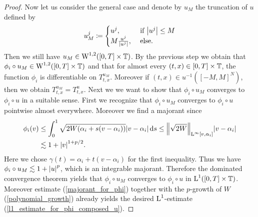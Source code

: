 \begin{proof}
	Now let us consider the general case and denote by $ u_{ M } $ the truncation of $ u $ defined by
	\begin{equation*}
		u_{ M }^{ j } 
		\coloneqq
		\begin{cases}
			u^{ j }, & \text{ if } \abs{ u^{ j } } \leq M 
			\\
			M \frac{ u^{ j } }{ \abs{ u^{ j } } },
			& \text{ else}.
		\end{cases}
	\end{equation*}
	Then we still have $ u_{ M } \in \operatorname{W}^{ 1, 2 } ( [ 0 , T ] \times 
	\operatorname{\mathbb{T}} ) $.
	 By the previous step we obtain that $ \phi_{ i } \circ u_{ M } \in \operatorname{W}^{ 
	 1, 2 } ( [ 0 , T ] \times \operatorname{\mathbb{T}} ) $ and that for almost every $ ( t, 
	 x ) \in [ 0 , T ] \times \operatorname{\mathbb{T}} $, the function $ \phi_{ i } $ is 
	 differentiable on $ T_{ t, x }^{ u_{ M } } $. Moreover if $ ( t, x ) \in 
	 u^{ - 1 } ( [ - M , M ]^{ N } ) $, then we obtain $ T_{ t, x }^{ u_{ M } } 
	 = T_{ t, x }^{ u } $.
	Next we we want to show that $ \phi_{ i } \circ u_{ M } $ converges to $ \phi_{ i } \circ u $ in a suitable sense. First we recognize that $ \phi_{ i } \circ u_{ M } $ converges to $ \phi_{ i } \circ u $ pointwise almost everywhere. Moreover we find a majorant since
	\begin{align}
		\notag
		\phi_{ i } ( v ) 
		&
		\leq
		\int_{ 0 }^{ 1 }
			\sqrt{ 2 W ( \alpha_{ i } + s ( v - \alpha_{ i } ) ) }
			\abs{ v - \alpha_{i } }
		\dd{ s }
		\leq
		\norm{ \sqrt{ 2 W } }_{ \operatorname{L}^{ \infty } [ v, \alpha_{ i } ] }
		\abs{ v - \alpha_{ i } }
		\\
		\label{majorant_for_phi}
		& \lesssim
		1 + \abs{ v }^{ 1 + p/2 }.
	\end{align}
	Here we chose $ \gamma ( t ) = \alpha_{ i } + t ( v - \alpha_{ i } ) $ for 
	the first inequality.
	Thus we have $ \phi_{ i } \circ u_{ M } \lesssim 1 + \abs{ u }^{ p } $, 
	which is an integrable majorant. Therefore the dominated convergence 
	theorem yields that $ \phi_{ i } \circ u_{ M } $ converges to $ \phi_{ i } 
	\circ u $ in $ \operatorname{L}^{ 1 } ( [ 0 , T ] \times \operatorname{\mathbb{T}} ) $.
	Moreover estimate (\ref{majorant_for_phi}) together with the $ p $-growth 
	of $ W $ (\ref{polynomial_growth}) already yields the desired $ \operatorname{L}^{ 1 } 
	$-estimate (\ref{l1_estimate_for_phi_composed_u}).
	

\end{proof}
